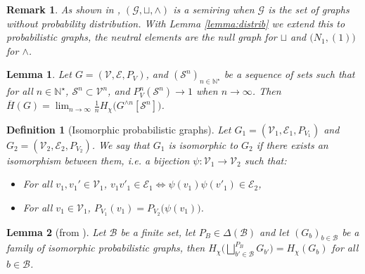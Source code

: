 \documentclass[conference,a4paper]{IEEEtran}
\newtheorem{lemma}{Lemma}
\newtheorem{definition}[theorem]{Definition}
\newtheorem{remark}[theorem]{Remark}
\begin{document}
\begin{remark}
    As shown in \cite{zuiddam2018algebraic}, $(\mathcal{G}, \sqcup, \wedge)$ is a semiring when $\mathcal{G}$ is the set of graphs without probability distribution. With Lemma \ref{lemma:distrib} we extend this to probabilistic graphs, the neutral elements are the null graph for $\sqcup$ and $\big(N_1, (1)\big)$ for $\wedge$.
\end{remark}\fi

\begin{lemma}\label{lemma:simplificationinduced}
    Let $G = (\mathcal{V}, \mathcal{E}, P_V)$, and $(\mathcal{S}^n)_{n \in \mathbb{N}^\star}$ be a sequence of sets such that for all $n \in \mathbb{N}^\star$, $\mathcal{S}^n \subset \mathcal{V}^n$, and $P^n_V(\mathcal{S}^n) \rightarrow 1$ when $n \rightarrow \infty$. Then $\overline{H}(G) = \lim_{n \rightarrow \infty} \frac{1}{n} H_\chi\big(G^{\wedge n}[\mathcal{S}^n]\big)$.
\end{lemma}

\begin{definition}[Isomorphic probabilistic graphs]
Let $G_1 = (\mathcal{V}_1, \mathcal{E}_1, P_{V_1})$ and $G_2 = (\mathcal{V}_2, \mathcal{E}_2, P_{V_2})$. We say that $G_1$ is isomorphic to $G_2$ if there exists an isomorphism between them, i.e. a bijection $\psi : \mathcal{V}_1 \rightarrow \mathcal{V}_2$ such that:
\begin{itemize}[label = - ]
    \item For all $v_1, v_1' \in \mathcal{V}_1$, $v_1 v'_1 \in \mathcal{E}_1 \Longleftrightarrow \psi(v_1)\psi(v'_1) \in \mathcal{E}_2$,
    \item For all $v_1 \in \mathcal{V}_1$, $P_{V_1}(v_1) = P_{V_2}\big(\psi(v_1)\big)$.
\end{itemize}
\end{definition}

\begin{lemma}[from \cite{charpenay2022zero}]\label{lemma:unionisomorph}
    Let $\mathcal{B}$ be a finite set, let $P_B \in \Delta(\mathcal{B})$ and let $(G_b)_{b \in \mathcal{B}}$ be a family of isomorphic probabilistic graphs, then $H_\chi\big(\bigsqcup_{b' \in \mathcal{B}}^{P_B} G_{b'} \big) = H_\chi(G_b)$ for all $b \in \mathcal{B}$.
\end{lemma}
\end{document}
